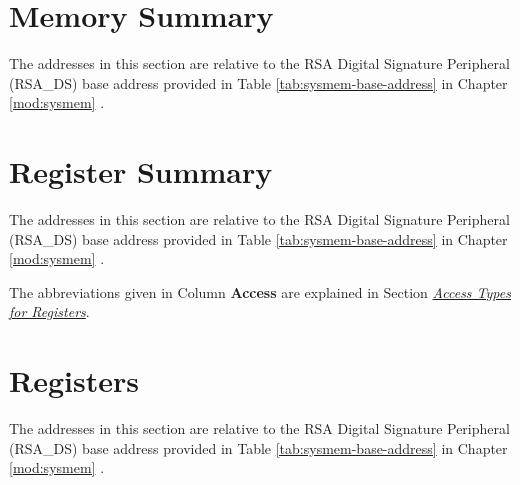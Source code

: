 \documentclass[main\_\_EN.tex]{subfiles}
\begin{document}

\clearpage
\section{Memory Summary}
\label{sec:digsig-mem-summ}

The addresses in this section are relative to the RSA Digital Signature Peripheral (RSA\_DS) base address provided in Table \ref{tab:sysmem-base-address} in Chapter \ref{mod:sysmem} \textit{}.






\clearpage
\section{Register Summary}
\label{sec:digsig-reg-summ}
\hypertarget{digsig-reg-summ}{}

The addresses in this section are relative to the RSA Digital Signature Peripheral (RSA\_DS) base address provided in Table \ref{tab:sysmem-base-address} in Chapter \ref{mod:sysmem} \textit{}.

The abbreviations given in Column \textbf{Access} are explained in Section \hyperref[glossary-access-types]{\textit{Access Types for Registers}}.






\clearpage
\section{Registers}

The addresses in this section are relative to the RSA Digital Signature Peripheral (RSA\_DS) base address provided in Table \ref{tab:sysmem-base-address} in Chapter \ref{mod:sysmem} \textit{}.


\end{document}
